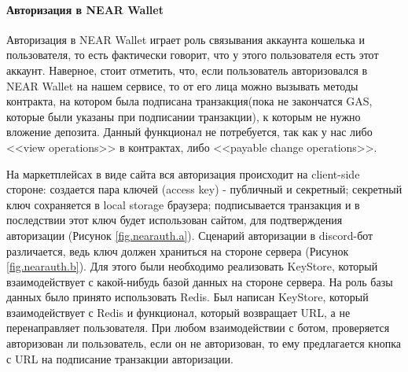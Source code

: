 \paragraph{Авторизация в NEAR Wallet}

Авторизация в NEAR Wallet играет роль связывания аккаунта кошелька и пользователя, то есть фактически говорит, что у этого пользователя есть этот аккаунт. Наверное, стоит отметить, что, если пользователь авторизовался в NEAR Wallet на нашем сервисе, то от его лица можно вызывать методы контракта, на котором была подписана транзакция(пока не закончатся GAS, которые были указаны при подписании транзакции), к которым не нужно вложение депозита. Данный функционал не потребуется, так как у нас либо <<view operations>> в контрактах, либо <<payable change operations>>.

На маркетплейсах в виде сайта вся авторизация происходит на client-side стороне: создается пара ключей (access key) - публичный и секретный; секретный ключ сохраняется в local storage браузера; подписывается транзакция и в последствии этот ключ будет использован сайтом, для подтверждения авторизации (Рисунок {\color{blue} \ref{fig.nearauth.a}}). Сценарий авторизации в discord-бот различается, ведь ключ должен храниться на стороне сервера (Рисунок {\color{blue} \ref{fig.nearauth.b}}). Для этого были необходимо реализовать KeyStore, который взаимодействует с какой-нибудь базой данных на стороне сервера. На роль базы данных было принято использовать Redis. Был написан KeyStore, который взаимодействует с Redis и функционал, который возвращает URL, а не перенаправляет пользователя. При любом взаимодействии с ботом, проверяется авторизован ли пользователь, если он не авторизован, то ему предлагается кнопка с URL на подписание транзакции авторизации.

